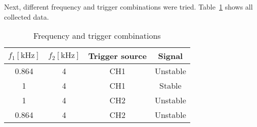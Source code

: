 Next, different frequency and trigger combinations were tried. Table~\ref{tab:triggering} shows all collected data.

\begin{table}[H]
	\centering
	\begin{tabular}{c|c|c|c}
		$f_{1} [\unit{\kilo\hertz}]$ & $f_{2} [\unit{\kilo\hertz}]$ & Trigger source & Signal\\
		\hline
		0.864 & 4 & CH1 & Unstable\\
		\hline
		1 & 4 & CH1 & Stable\\
		\hline
		1 & 4 & CH2 & Unstable\\
		\hline
		0.864 & 4 & CH2 & Unstable\\
	\end{tabular}
	\caption{Frequency and trigger combinations}
	\label{tab:triggering}
\end{table}







